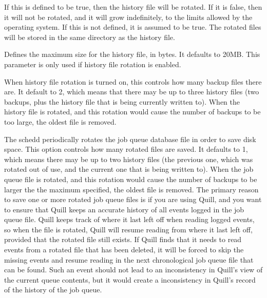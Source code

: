\begin{description}
\label{param:EnableHistoryRotation} 
\item[\Macro{ENABLE\_HISTORY\_ROTATION}]
  If this is defined to be true, then the
  history file will be rotated. If it is false, then it will not be
  rotated, and it will grow indefinitely, to the limits allowed by the
  operating system. If this is not defined, it is assumed to be
  true. The rotated files will be stored in the same directory as the
  history file. 

\label{param:MaxHistoryLog}
\item[\Macro{MAX\_HISTORY\_LOG}]
  Defines the maximum size for the history file, in bytes. It defaults
  to 20MB. This parameter is only used if history file rotation is
  enabled. 

\label{param:MaxHistoryRotations}
\item[\Macro{MAX\_HISTORY\_ROTATIONS}]
  When history file rotation is turned on, this controls how many
  backup files there are. It default to 2, which means that there may
  be up to three history files (two backups, plus the history file
  that is being currently written to). When the history file is
  rotated, and this rotation would cause the number of backups to be
  too large, the oldest file is removed. 

\label{param:MaxJobQueueLogRotations}
\item[\Macro{MAX\_JOB\_QUEUE\_LOG\_ROTATIONS}]
  The schedd periodically rotates the job queue database file in order
  to save disk space.  This option controls how many rotated files are
  saved.  It defaults to 1, which means there may be up to two history
  files (the previous one, which was rotated out of use, and the current one
  that is being written to).  When the job queue file is rotated,
  and this rotation would cause the number of backups to be larger
  the the maximum specified, the oldest file is removed.  The primary
  reason to save one or more rotated job queue files is if you are
  using Quill, and you want to ensure that Quill keeps an accurate history
  of all events logged in the job queue file.  Quill keeps track of where
  it last left off when reading logged events, so when the file is rotated,
  Quill will resume reading from where it last left off, provided that
  the rotated file still exists.  If Quill finds that it needs to read
  events from a rotated file that has been deleted, it will be forced to
  skip the missing events and resume reading in the next chronological job
  queue file that can be found.  Such an event should not lead to
  an inconsistency in Quill's view of the current queue contents, but it
  would create a inconsistency in Quill's record of the history of the
  job queue.


\end{description}
